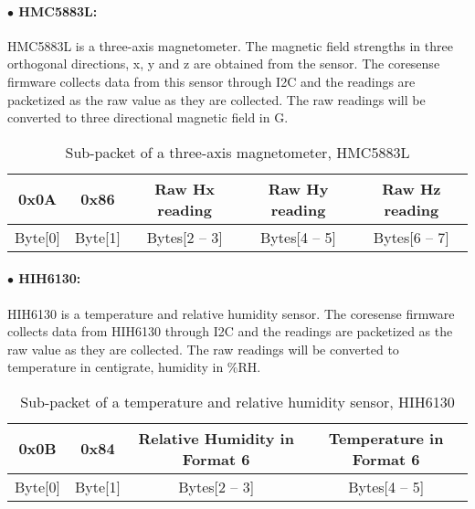 \paragraph{$\bullet$ HMC5883L:}
HMC5883L is a three-axis magnetometer. The magnetic field strengths in three orthogonal directions, x, y and z are obtained from the sensor.
The coresense firmware collects data from this sensor through I2C and the readings are packetized as the raw value as they are collected.
The raw readings will be converted to three directional magnetic field in G.
\\

\begin{table}[h!]
    \centering
    \caption{Sub-packet of a three-axis magnetometer, HMC5883L}
    \begin{tabular}{|c|c|c|c|c|}
        \hline
        \rowcolor{black!8}
        \textbf{0x0A} & \textbf{0x86} & \textbf{Raw Hx reading} & \textbf{Raw Hy reading} & \textbf{Raw Hz reading}\\
        \hline
        Byte[0] & Byte[1] & Bytes[2 -- 3] & Bytes[4 -- 5] & Bytes[6 -- 7] \\ \hline
    \end{tabular}
\end{table}



\paragraph{$\bullet$ HIH6130:}
HIH6130 is a temperature and relative humidity sensor.
The coresense firmware collects data from HIH6130 through I2C and the readings are packetized as the raw value as they are collected.
The raw readings will be converted to temperature in centigrate, humidity in \%RH.
\\

\begin{table}[h!]
    \centering
    \caption{Sub-packet of a temperature and relative humidity sensor, HIH6130}
    \begin{tabular}{|c|c|c|c|}
        \hline
        \rowcolor{black!8}
        \textbf{0x0B} & \textbf{0x84} & \textbf{Relative Humidity in Format 6} & \textbf{Temperature in Format 6} \\
        \hline
        Byte[0] & Byte[1] & Bytes[2 -- 3] & Bytes[4 -- 5] \\ \hline
    \end{tabular}
\end{table}


